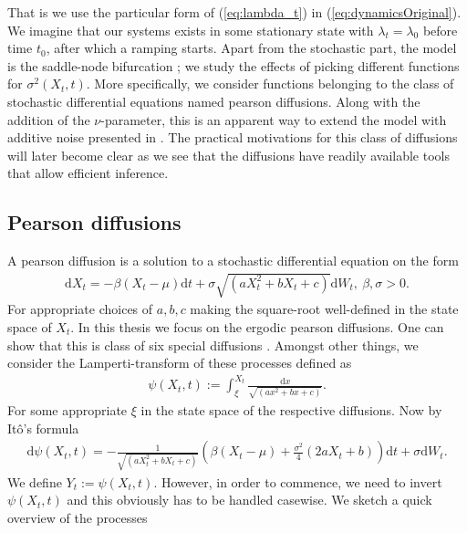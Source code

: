 That is we use the particular form of (\ref{eq:lambda_t}) in (\ref{eq:dynamicsOriginal}). We imagine that our systems exists in some stationary state with $\lambda_t = \lambda_0$ before time $t_0$, after which a ramping starts. Apart from the stochastic part, the model is the saddle-node bifurcation \cite{Strogatz2019_gv}; we study the effects of picking different functions for $\sigma^2(X_t, t)$. More specifically, we consider functions belonging to the class of stochastic differential equations named pearson diffusions. Along with the addition of the $\nu$-parameter, this is an apparent way to extend the model with additive noise presented in \cite[equation (1)]{Ditlevsen2023}. The practical motivations for this class of diffusions will later become clear as we see that the diffusions have readily available tools that allow efficient inference.
\subsection{Pearson diffusions}
A pearson diffusion is a solution to a stochastic differential equation on the form
\begin{align}
    \mathrm{d}X_t = -\beta \left(X_t - \mu\right)\mathrm{d}t + \sigma\sqrt{\left(aX_t^2 + bX_t + c\right)}\mathrm{d}W_t, \: \beta, \sigma > 0. \label{eq:pearsonDiffusion}
\end{align}
For appropriate choices of $a, b, c$ making the square-root well-defined in the state space of $X_t$. In this thesis we focus on the ergodic pearson diffusions. One can show that this is class of six special diffusions \cite[p.36]{StatisticalMethodsForSDE}. Amongst other things, we consider the Lamperti-transform of these processes defined as
\begin{align}
    \psi\left(X_t, t\right) := \int_{\xi}^{X_t} \frac{\mathrm{d}x}{\sqrt{\left(ax^2 + bx + c\right)}}. \label{eq:lampertiDefinition}
\end{align}
For some appropriate $\xi$ in the state space of the respective diffusions. Now by Itô's formula
\begin{align}
    \mathrm{d}\psi\left(X_t, t\right) = - \frac{1}{\sqrt{\left(aX_t^2 + bX_t + c\right)}}\left(\beta\left(X_t - \mu\right) + \frac{\sigma^2}{4}\left(2aX_t + b\right)\right)\mathrm{d}t + \sigma \mathrm{d}W_t.
\end{align}
We define $Y_t := \psi\left(X_t, t\right)$. However, in order to commence, we need to invert $\psi\left(X_t, t\right)$ and this obviously has to be handled casewise. We sketch a quick overview of the processes
